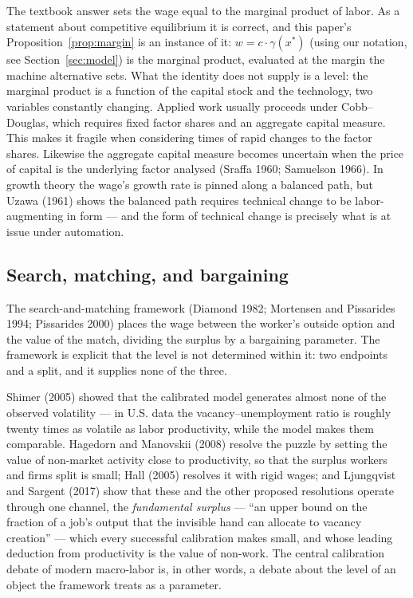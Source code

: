 \documentclass[12pt]{article}
\theoremstyle{plain}
\begin{document}
The textbook answer sets the wage equal to the marginal product of labor. As a statement about competitive equilibrium it is correct, and this paper's Proposition~\ref{prop:margin} is an instance of it: $w = c\cdot \gamma (x^*)$ (using our notation, see Section~\ref{sec:model}) is the marginal product, evaluated at the margin the machine alternative sets. What the identity does not supply is a level: the marginal product is a function of the capital stock and the technology, two variables constantly changing. Applied work usually proceeds under Cobb--Douglas, which requires fixed factor shares and an aggregate capital measure. This makes it fragile when considering times of rapid changes to the factor shares. Likewise the aggregate capital measure becomes uncertain when the price of capital is the underlying factor analysed (Sraffa 1960; Samuelson 1966). In growth theory the wage's growth rate is pinned along a balanced path, but Uzawa (1961) shows the balanced path requires technical change to be labor-augmenting in form --- and the form of technical change is precisely what is at issue under automation.

\subsection{Search, matching, and bargaining}\label{sec:search}

The search-and-matching framework (Diamond 1982; Mortensen and Pissarides 1994; Pissarides 2000) places the wage between the worker's outside option and the value of the match, dividing the surplus by a bargaining parameter. The framework is explicit that the level is not determined within it: two endpoints and a split, and it supplies none of the three.

Shimer (2005) showed that the calibrated model generates almost none of the observed volatility --- in U.S. data the vacancy--unemployment ratio is roughly twenty times as volatile as labor productivity, while the model makes them comparable. Hagedorn and Manovskii (2008) resolve the puzzle by setting the value of non-market activity close to productivity, so that the surplus workers and firms split is small; Hall (2005) resolves it with rigid wages; and Ljungqvist and Sargent (2017) show that these and the other proposed resolutions operate through one channel, the \emph{fundamental surplus} --- ``an upper bound on the fraction of a job's output that the invisible hand can allocate to vacancy creation'' --- which every successful calibration makes small, and whose leading deduction from productivity is the value of non-work. The central calibration debate of modern macro-labor is, in other words, a debate about the level of an object the framework treats as a parameter.
\end{document}

